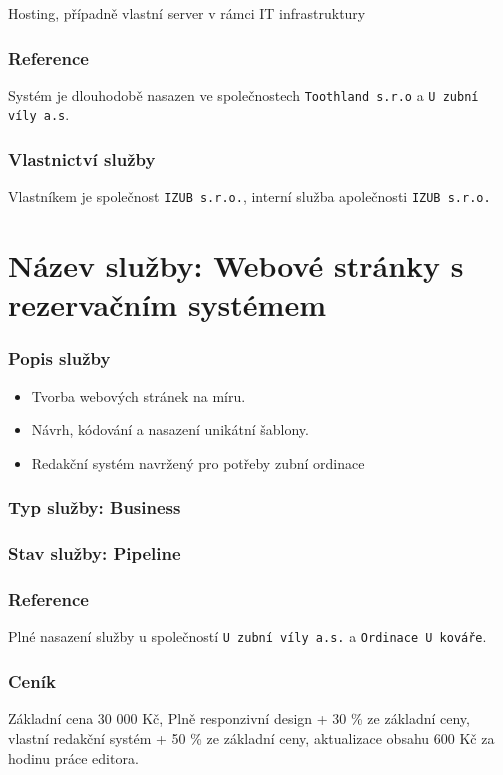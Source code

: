 \documentclass[11pt, a4paper, titlepage]{article}
\begin{document}
	Hosting, případně vlastní server v rámci IT infrastruktury

	\subsubsection*{Reference}
	Systém je dlouhodobě nasazen ve společnostech \texttt{Toothland s.r.o} a \texttt{U zubní víly a.s}.

	\subsubsection*{Vlastnictví služby}

	Vlastníkem je společnost \texttt{IZUB s.r.o.}, interní služba apolečnosti \texttt{IZUB s.r.o.}

	\section*{Název služby: Webové stránky s rezervačním systémem}

	\subsubsection*{Popis služby}
	\begin{itemize}
		\item Tvorba webových stránek na míru.
		\item Návrh, kódování a nasazení unikátní šablony.
		\item Redakční systém navržený pro potřeby zubní ordinace
	\end{itemize}

	\subsubsection*{Typ služby:  Business}

	\subsubsection*{Stav služby: Pipeline}

	\subsubsection*{Reference}
	Plné nasazení služby u společností \texttt{U zubní víly a.s.} a \texttt{Ordinace U kováře}.

	\subsubsection*{Ceník}
	Základní cena 30 000 Kč, Plně responzivní design + 30 \% ze základní ceny, vlastní redakční systém + 50 \% ze základní ceny, aktualizace obsahu 600 Kč za hodinu práce editora.
\end{document}
